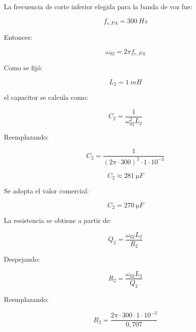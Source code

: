 \documentclass[12pt,a4paper]{article}
\begin{document}
La frecuencia de corte inferior elegida para la banda de voz fue:

\begin{equation}
    f_{c,PA}=\SI{300}{Hz}
    \label{eq:fc_pa}
\end{equation}

Entonces:

\begin{equation}
    \omega_{02}=2\pi f_{c,PA}
    \label{eq:w02_fc}
\end{equation}

Como se fijó:

\begin{equation}
    L_2=\SI{1}{mH}
    \label{eq:l2_valor}
\end{equation}

el capacitor se calcula como:

\begin{equation}
    C_2=
    \frac{1}{\omega_{02}^2L_2}
    \label{eq:c2_calculo}
\end{equation}

Reemplazando:

\begin{equation}
    C_2=
    \frac{1}
    {(2\pi\cdot 300)^2\cdot 1\cdot 10^{-3}}
    \label{eq:c2_reemplazo}
\end{equation}

\begin{equation}
    \boxed{
    C_2\approx \SI{281}{\micro F}
    }
    \label{eq:c2_resultado}
\end{equation}

Se adopta el valor comercial:

\begin{equation}
    \boxed{
    C_2=\SI{270}{\micro F}
    }
    \label{eq:c2_comercial}
\end{equation}

La resistencia se obtiene a partir de:

\begin{equation}
    Q_2=\frac{\omega_{02}L_2}{R_2}
    \label{eq:q2_resistencia}
\end{equation}

Despejando:

\begin{equation}
    R_2=\frac{\omega_{02}L_2}{Q_2}
    \label{eq:r2_calculo}
\end{equation}

Reemplazando:

\begin{equation}
    R_2=
    \frac{2\pi\cdot 300\cdot 1\cdot 10^{-3}}
    {0{,}707}
    \label{eq:r2_reemplazo}
\end{equation}
\end{document}
